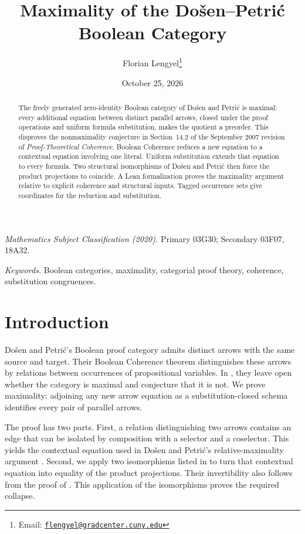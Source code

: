 \documentclass[11pt]{article}
\title{Maximality of the Do\v{s}en--Petri\'c Boolean Category}
\author{Florian Lengyel\thanks{Email: \href{mailto:flengyel@gradcenter.cuny.edu}{\texttt{flengyel@gradcenter.cuny.edu}}}}
\date{October 25, 2026}
\begin{document}
\maketitle

\begin{abstract}
The freely generated zero-identity Boolean category of Do\v{s}en and
Petri\'c is maximal: every additional equation between distinct parallel
arrows, closed under the proof operations and uniform formula
substitution, makes the quotient a preorder. This disproves the
nonmaximality conjecture in Section~14.2 of the September 2007 revision
of \emph{Proof-Theoretical Coherence}. Boolean Coherence reduces a new
equation to a contextual equation involving one literal. Uniform
substitution extends that equation to every formula. Two structural
isomorphisms of Do\v{s}en and Petri\'c then force the product projections
to coincide. A Lean formalization proves the maximality argument
relative to explicit coherence and structural inputs. Tagged occurrence
sets give coordinates for the reduction and substitution.
\end{abstract}

\medskip
\noindent\textit{Mathematics Subject Classification (2020).}
Primary 03G30; Secondary 03F07, 18A32.

\smallskip
\noindent\textit{Keywords.} Boolean categories, maximality, categorial proof theory,
coherence, substitution congruences.

\section{Introduction}

Do\v{s}en and Petri\'c's Boolean proof category admits distinct arrows
with the same source and target. Their Boolean Coherence theorem
distinguishes these arrows by relations between occurrences of
propositional variables. In \cite[\S14.2, p.~322]{DP}, they leave open
whether the category is maximal and conjecture that it is not. We prove
maximality: adjoining any new arrow equation as a substitution-closed
schema identifies every pair of parallel arrows.

The proof has two parts. First, a relation distinguishing two arrows
contains an edge that can be isolated by composition with a selector
and a coselector. This yields the contextual equation used in
Do\v{s}en and Petri\'c's relative-maximality argument
\cite[\S9.7, pp.~215--216]{DP}. Second, we apply two isomorphisms listed in
\cite[\S12.5, p.~294]{DP} to turn that contextual equation into equality
of the product projections. Their invertibility also follows from the
proof of \cite[Lemma~7]{DPIsomorphic}. This application of the
isomorphisms proves the required collapse.
\end{document}
